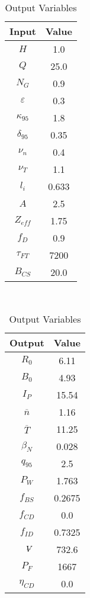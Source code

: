 \begin{table}[b!]
\centering
\caption{Proteus Variables}
\hfill
\begin{subtable}[t]{0.4\textwidth}
\centering
\caption{Input Variables} ~\\
\begin{tabular}{ c|c }

Input            & Value           \\
\hline
$H$              & 1.0              \\
$Q$              & 25.0             \\
$N_{G}$          & 0.9              \\
$\varepsilon$       & 0.3              \\
$\kappa_{95}$    & 1.8              \\
$\delta_{95}$    & 0.35             \\
$\nu_{n}$        & 0.4              \\
$\nu_{T}$        & 1.1              \\
$l_{i}$          & 0.633         \\
$A$              & 2.5              \\
$Z_{eff}$        & 1.75             \\
$f_{D}$          & 0.9              \\
$\tau_{FT}$      & 7200           \\
$B_{CS}$         & 20.0             \\

\end{tabular}
\end{subtable}
\hfill
\begin{subtable}[t]{0.5\textwidth}
\centering
\caption{Output Variables} ~\\
\begin{tabular}{ c|c }

Output           & Value       \\
\hline
$R_{0}$          & 6.11             \\
$B_{0}$          & 4.93            \\
$I_{P}$          & 15.54            \\
$\overline n$    & 1.16            \\
$\overline T$    & 11.25            \\
$\beta_{N}$       & 0.028            \\
$q_{95}$         & 2.5              \\
$P_{W}$          & 1.763            \\
$f_{BS}$         & 0.2675           \\
$f_{CD}$         & 0.0              \\
$f_{ID}$         & 0.7325           \\
$\volume$         & 732.6            \\
$P_{F}$          & 1667           \\
$\eta_{CD}$      & 0.0              \\


\end{tabular}
\end{subtable}
\end{table}
